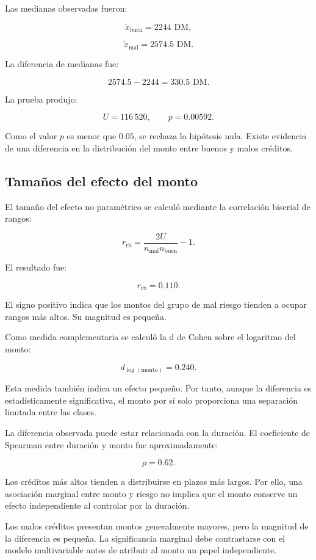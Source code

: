 Las medianas observadas fueron:

\[
\widetilde{x}_{\mathrm{buen}}
=
2244\text{ DM},
\]

\[
\widetilde{x}_{\mathrm{mal}}
=
2574.5\text{ DM}.
\]

La diferencia de medianas fue:

\[
2574.5-2244
=
330.5\text{ DM}.
\]

La prueba produjo:

\[
U=116\,520,
\qquad
p=0.00592.
\]

Como el valor \(p\) es menor que \(0.05\), se rechaza la hipótesis nula.
Existe evidencia de una diferencia en la distribución del monto entre
buenos y malos créditos.

\subsection{Tamaños del efecto del monto}

El tamaño del efecto no paramétrico se calculó mediante la correlación
biserial de rangos:

\[
r_{\mathrm{rb}}
=
\frac{
    2U
}{
    n_{\mathrm{mal}}n_{\mathrm{buen}}
}
-1.
\]

El resultado fue:

\[
r_{\mathrm{rb}}=0.110.
\]

El signo positivo indica que los montos del grupo de mal riesgo tienden a
ocupar rangos más altos. Su magnitud es pequeña.

Como medida complementaria se calculó la d de Cohen sobre el logaritmo
del monto:

\[
d_{\log(\mathrm{monto})}
=
0.240.
\]

Esta medida también indica un efecto pequeño. Por tanto, aunque la
diferencia es estadísticamente significativa, el monto por sí solo
proporciona una separación limitada entre las clases.

La diferencia observada puede estar relacionada con la duración. El
coeficiente de Spearman entre duración y monto fue aproximadamente:

\[
\rho=0.62.
\]

Los créditos más altos tienden a distribuirse en plazos más largos. Por
ello, una asociación marginal entre monto y riesgo no implica que el
monto conserve un efecto independiente al controlar por la duración.

\begin{hallazgo}
Los malos créditos presentan montos generalmente mayores, pero la
magnitud de la diferencia es pequeña. La significancia marginal debe
contrastarse con el modelo multivariable antes de atribuir al monto un
papel independiente.
\end{hallazgo}

